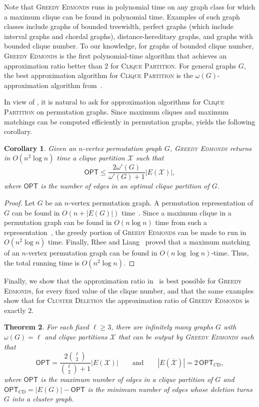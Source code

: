 \documentclass[a4paper,fleqn]{cas-sc}
\newtheorem{thm}{Theorem}[section]
\newtheorem{cor}[thm]{Corollary}
\theoremstyle{remark}
\theoremstyle{plain}
\newcommand{\cd}{\textsc{Cluster Deletion}}
\newcommand{\cp}{\textsc{Clique Partition}}
\newcommand{\edmonds}{{\textsc{Greedy Edmonds}}}
\newcommand{\opt}{{\mathsf{OPT}}}
\begin{document}
Note that \edmonds{} runs in polynomial time on any graph class for which a maximum clique can be found in polynomial time.  Examples of such graph classes include graphs of bounded treewidth, perfect graphs (which include interval graphs and chordal graphs), distance-hereditary graphs, and graphs with bounded clique number.
To our knowledge, for graphs of bounded clique number, \edmonds{} is
the first polynomial-time algorithm that achieves an approximation
ratio better than $2$ for \cp. For general graphs $G$, the best
approximation algorithm for \cp{} is the $\omega(G)$-approximation
algorithm from~\cite{DESSMARK2007}.

In view of , it is natural to ask for approximation algorithms for \cp{} on permutation graphs.  Since maximum cliques and maximum matchings can be computed efficiently in permutation graphs,  yields the following corollary.

\begin{cor} \label{cor:perm-approx}
  Given an $n$-vertex permutation graph $G$, \edmonds{} returns in
  $O(n^2\log n)$ time a clique partition $\mathcal{X}$ such that
  \[
  \opt \leq
  \frac{2\omega'(G)}{\omega'(G)+1}|E(\mathcal{X})|,
  \]
  where $\opt$ is the number of edges in an optimal clique partition
  of $G$.
\end{cor}

\begin{proof}
    Let $G$ be an $n$-vertex permutation graph.  A permutation representation of $G$ can be found in $O(n+|E(G)|)$ time~\cite{MS99}. Since a maximum clique in a permutation graph can be found in $O(n \log n)$ time from such a representation~\cite{Fredman75}, the greedy portion of \edmonds{} can be made to run in $O(n^2 \log n)$ time.
    Finally, Rhee and Liang~\cite{RL95} proved that a maximum matching of an $n$-vertex permutation graph can be found in $O(n \log \log n)$-time. Thus, the total running time is $O(n^2\log n)$.
\end{proof}

Finally, we show that the approximation ratio in~ is best possible for \edmonds{}, for every fixed value of the clique number, and that the same examples show that for \cd{} the approximation ratio of \edmonds{} is exactly $2$.

\begin{thm} \label{thm:tight-summary}
        For each fixed $\ell \geq 3$, there are infinitely many graphs $G$ with $\omega(G)=\ell$ and clique partitions $\mathcal{X}$ that can be output by \edmonds{} such that
        \[
        \opt=
        \frac{2\binom{\ell}{2}}{\binom{\ell}{2}+1}
        |E(\mathcal{X})|
        \qquad\text{and}\qquad
        |E(\overline{\mathcal{X}})|=2\,\opt_{\mathrm{CD}},
        \]
        where $\opt$ is the maximum number of edges in a clique partition of $G$ and $\opt_{\mathrm{CD}}=|E(G)|-\opt$ is the minimum number of edges whose deletion turns $G$ into a cluster graph.
   \end{thm}
 
\end{document}
